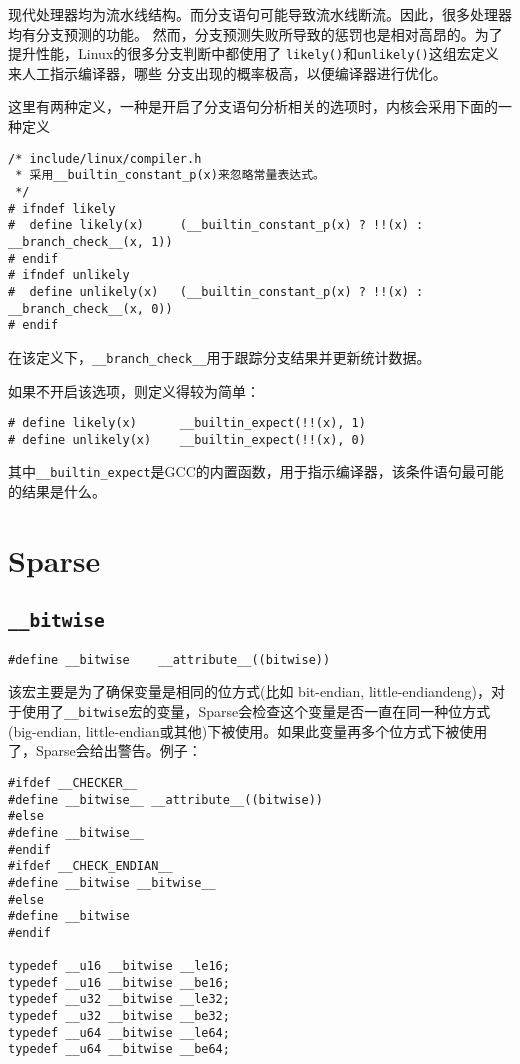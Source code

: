 		现代处理器均为流水线结构。而分支语句可能导致流水线断流。因此，很多处理器均有分支预测的功能。
然而，分支预测失败所导致的惩罚也是相对高昂的。为了提升性能，Linux的很多分支判断中都使用了
\texttt{likely()}和\texttt{unlikely()}这组宏定义来人工指示编译器，哪些
分支出现的概率极高，以便编译器进行优化。

		这里有两种定义，一种是开启了分支语句分析相关的选项时，内核会采用下面的一种定义
\begin{verbatim}
/* include/linux/compiler.h
 * 采用__builtin_constant_p(x)来忽略常量表达式。
 */
# ifndef likely
#  define likely(x)     (__builtin_constant_p(x) ? !!(x) : __branch_check__(x, 1))
# endif
# ifndef unlikely
#  define unlikely(x)   (__builtin_constant_p(x) ? !!(x) : __branch_check__(x, 0))
# endif
\end{verbatim}

		在该定义下，\texttt{__branch_check__}用于跟踪分支结果并更新统计数据。

		如果不开启该选项，则定义得较为简单：
\begin{verbatim}
# define likely(x)      __builtin_expect(!!(x), 1)
# define unlikely(x)    __builtin_expect(!!(x), 0)
\end{verbatim}
其中\texttt{__builtin_expect}是GCC的内置函数，用于指示编译器，该条件语句最可能的结果是什么。

	\section{Sparse}

		\subsection{\texttt{__bitwise}}
\begin{verbatim}
#define __bitwise    __attribute__((bitwise))     
\end{verbatim}
		
		该宏主要是为了确保变量是相同的位方式(比如 bit-endian, little-endiandeng)，对于使用了\texttt{__bitwise}宏的变量，Sparse会检查这个变量是否一直在同一种位方式(big-endian, little-endian或其他)下被使用。如果此变量再多个位方式下被使用了，Sparse会给出警告。例子：

\begin{verbatim}
#ifdef __CHECKER__
#define __bitwise__ __attribute__((bitwise))
#else
#define __bitwise__
#endif
#ifdef __CHECK_ENDIAN__
#define __bitwise __bitwise__
#else
#define __bitwise
#endif

typedef __u16 __bitwise __le16;
typedef __u16 __bitwise __be16;
typedef __u32 __bitwise __le32;
typedef __u32 __bitwise __be32;
typedef __u64 __bitwise __le64;
typedef __u64 __bitwise __be64;
\end{verbatim}
		
